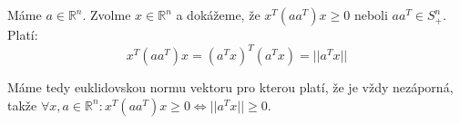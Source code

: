 \documentclass[12pt, a4paper]{article}
\begin{document}
\section{}
\vspace{0.5\textheight}
\section{}
Máme $a \in \mathbb{R}^n$. Zvolme $x \in \mathbb{R}^n$ a dokážeme, že $x^T(aa^T)x \geq 0$ neboli $aa^T \in S^n_{+}$. Platí:
\[
x^T(aa^T)x = (a^Tx)^T(a^Tx) = ||a^Tx||
\]

Máme tedy euklidovskou normu vektoru pro kterou platí, že je vždy nezáporná, takže $\forall x,a \in \mathbb{R}^n: x^T(aa^T)x \geq 0 \iff ||a^Tx|| \geq 0$.

\section{}
\end{document}
